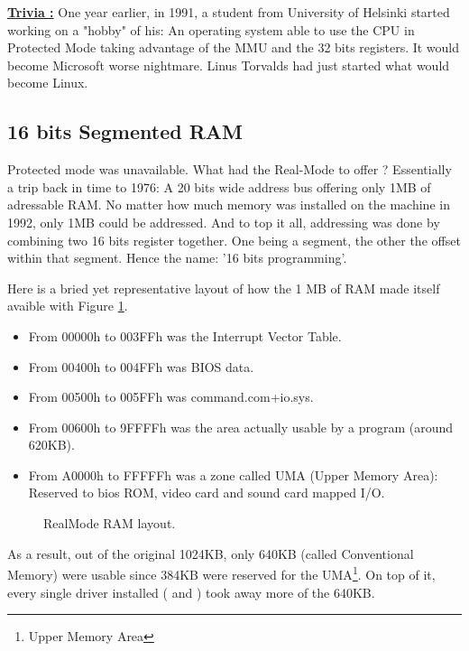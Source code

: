 \documentclass[book.tex]{subfiles}
\begin{document}
\bigskip

 \textbf{\underline{Trivia :}} One year earlier, in 1991, a student from University of Helsinki started working on a "hobby" of his: An operating system able to use the CPU in Protected Mode taking advantage of the MMU and the 32 bits registers. It would become Microsoft worse nightmare. Linus Torvalds had just started what would become Linux.



  \subsection{16 bits Segmented RAM}
  Protected mode was unavailable. What had the Real-Mode to offer ? Essentially a trip back in time to 1976: A 20 bits wide address bus offering only 1MB of adressable RAM. No matter how much memory was installed on the machine in 1992, only 1MB could be addressed. And to top it all, addressing was done by combining two 16 bits register together. One being a segment, the other the offset within that segment. Hence the name: '16 bits programming'.

  \bigskip
Here is a bried yet representative layout of how the 1 MB of RAM made itself avaible with Figure \ref{fig:RealMode_RAM_layout}.\\
\begin{itemize}
\item From 00000h to 003FFh was the Interrupt Vector Table.
\item From 00400h to 004FFh was BIOS data.
\item From 00500h to 005FFh was command.com+io.sys.
\item From 00600h to 9FFFFh  was the area actually usable by a program (around 620KB). 
\item From A0000h to FFFFFh was a zone called UMA (Upper Memory Area): Reserved to bios ROM, video card and sound card mapped I/O.
\end{itemize}

  \begin{figure}[H]
\centering
 
 \caption{RealMode RAM layout.} \label{fig:RealMode_RAM_layout}
 \end{figure}


As a result, out of the original 1024KB, only 640KB (called Conventional Memory) were usable since 384KB were reserved for the UMA\footnote{Upper Memory Area}. On top of it, every single driver installed ( and )  took away more of the 640KB.
\end{document}
